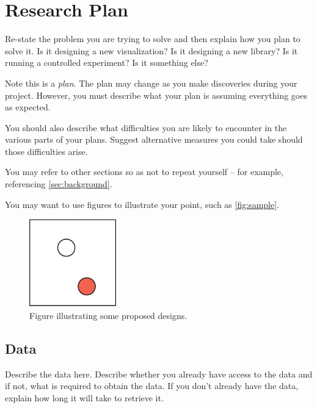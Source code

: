 \section{Research Plan} 
\label{sec:research}

Re-state the problem you are trying to solve and then explain how you plan to
solve it. Is it designing a new visualization? Is it designing a new library?
Is it running a controlled experiment? Is it something else?

Note this is a {\em plan}. The plan may change as you make discoveries during
your project. However, you must describe what your plan is assuming everything
goes as expected. 

You should also describe what difficulties you are likely to encounter in the
various parts of your plans. Suggest alternative measures you could take
should those difficulties arise.

You may refer to other sections so as not to repeat yourself -- for example,
referencing \autoref{sec:background}.

You may want to use figures to illustrate your point, such as
\autoref{fig:sample}.

\begin{figure}[h]
 \centering %
 \includegraphics[width=1.5in]{figs/sample}
 \caption{Figure illustrating some proposed designs.}
 \label{fig:sample}
\end{figure}

\subsection{Data}
\label{sec:data}

Describe the data here. Describe whether you already have access to the data
and if not, what is required to obtain the data. If you don't already have the
data, explain how long it will take to retrieve it. 

